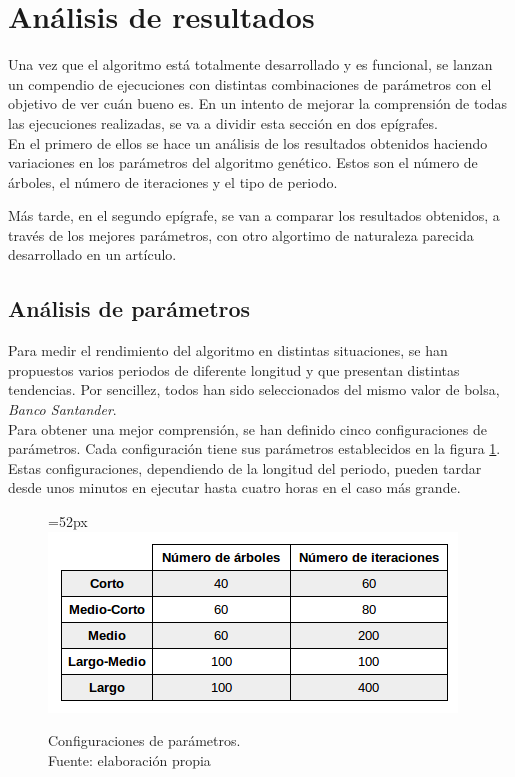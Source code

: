 \section{An\'alisis de resultados}
Una vez que el algoritmo est\'a totalmente desarrollado y es funcional, se lanzan un compendio de ejecuciones con distintas combinaciones de par\'ametros con el objetivo de ver cu\'an bueno es.
En un intento de mejorar la comprensi\'on de todas las ejecuciones realizadas, se va a dividir esta secci\'on en dos ep\'igrafes. \\

En el primero de ellos se hace un an\'alisis de los resultados obtenidos haciendo variaciones en los par\'ametros del algoritmo gen\'etico. Estos son el n\'umero de \'arboles, el n\'umero de iteraciones y el tipo de periodo. 

M\'as tarde, en el segundo ep\'igrafe, se van a comparar los resultados obtenidos, a trav\'es de los mejores par\'ametros, con otro algortimo de naturaleza parecida desarrollado en un art\'iculo.


\subsection{An\'alisis de par\'ametros}

Para medir el rendimiento del algoritmo en distintas situaciones, se han propuestos varios periodos de diferente longitud y que presentan distintas tendencias. Por sencillez, todos han sido seleccionados del mismo valor de bolsa, \textit{Banco Santander}.\\

Para obtener una mejor comprensi\'on, se han definido cinco configuraciones de par\'ametros. Cada configuraci\'on tiene sus par\'ametros establecidos en la figura \ref{fig:params}. Estas configuraciones, dependiendo de la longitud del periodo, pueden tardar desde unos minutos en ejecutar hasta cuatro horas en el caso m\'as grande.

     	\begin{figure}[H]
     		\centering\leftskip=52px
     		\includegraphics[scale=0.65]{imagenes/params.png}
     		\caption[Configuraciones de par\'ametros]{Configuraciones de par\'ametros.\\ Fuente: elaboraci\'on propia}
     		\label{fig:params}
     	\end{figure}

